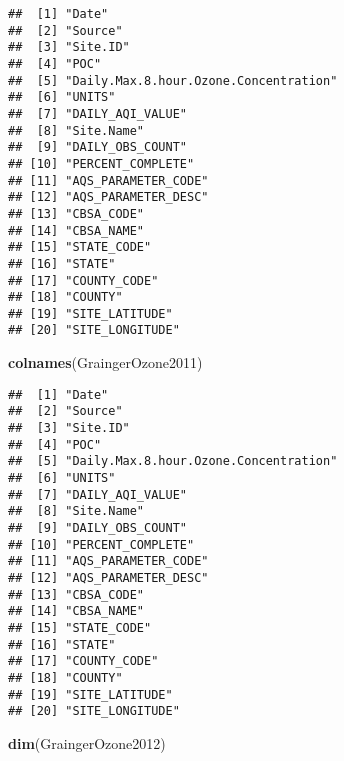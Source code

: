 \documentclass[]{article}
\newenvironment{Shaded}{\begin{snugshade}}{\end{snugshade}}
\newcommand{\KeywordTok}[1]{\textcolor[rgb]{0.13,0.29,0.53}{\textbf{#1}}}
\newcommand{\NormalTok}[1]{#1}
\begin{document}
\begin{verbatim}
##  [1] "Date"                                
##  [2] "Source"                              
##  [3] "Site.ID"                             
##  [4] "POC"                                 
##  [5] "Daily.Max.8.hour.Ozone.Concentration"
##  [6] "UNITS"                               
##  [7] "DAILY_AQI_VALUE"                     
##  [8] "Site.Name"                           
##  [9] "DAILY_OBS_COUNT"                     
## [10] "PERCENT_COMPLETE"                    
## [11] "AQS_PARAMETER_CODE"                  
## [12] "AQS_PARAMETER_DESC"                  
## [13] "CBSA_CODE"                           
## [14] "CBSA_NAME"                           
## [15] "STATE_CODE"                          
## [16] "STATE"                               
## [17] "COUNTY_CODE"                         
## [18] "COUNTY"                              
## [19] "SITE_LATITUDE"                       
## [20] "SITE_LONGITUDE"
\end{verbatim}

\begin{Shaded}
\begin{Highlighting}[]
\KeywordTok{colnames}\NormalTok{(GraingerOzone2011)}
\end{Highlighting}
\end{Shaded}

\begin{verbatim}
##  [1] "Date"                                
##  [2] "Source"                              
##  [3] "Site.ID"                             
##  [4] "POC"                                 
##  [5] "Daily.Max.8.hour.Ozone.Concentration"
##  [6] "UNITS"                               
##  [7] "DAILY_AQI_VALUE"                     
##  [8] "Site.Name"                           
##  [9] "DAILY_OBS_COUNT"                     
## [10] "PERCENT_COMPLETE"                    
## [11] "AQS_PARAMETER_CODE"                  
## [12] "AQS_PARAMETER_DESC"                  
## [13] "CBSA_CODE"                           
## [14] "CBSA_NAME"                           
## [15] "STATE_CODE"                          
## [16] "STATE"                               
## [17] "COUNTY_CODE"                         
## [18] "COUNTY"                              
## [19] "SITE_LATITUDE"                       
## [20] "SITE_LONGITUDE"
\end{verbatim}

\begin{Shaded}
\begin{Highlighting}[]
\KeywordTok{dim}\NormalTok{(GraingerOzone2012)}
\end{Highlighting}
\end{Shaded}
\end{document}

